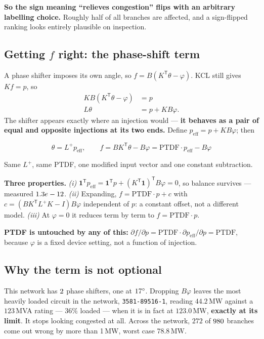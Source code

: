 \documentclass[11pt,a4paper]{article}
\newcommand{\T}{^{\mathsf{T}}}
\newcommand{\Lp}{L^{+}}
\begin{document}
\textbf{So the sign meaning ``relieves congestion'' flips with an arbitrary
labelling choice.} Roughly half of all branches are affected, and a
sign-flipped ranking looks entirely plausible on inspection.

\subsection*{Getting $f$ right: the phase-shift term}

A phase shifter imposes its own angle, so $f = B(K\T\theta - \varphi)$. KCL
still gives $Kf = p$, so
\begin{align}
  K B (K\T\theta - \varphi) &= p\\
  L\theta &= p + KB\varphi .
\end{align}
The shifter appears exactly where an injection would --- \textbf{it behaves as
a pair of equal and opposite injections at its two ends.} Define
$p_{\text{eff}} = p + KB\varphi$; then

\begin{equation}
  \boxed{\;\theta = \Lp p_{\text{eff}}, \qquad
  f = B K\T\theta - B\varphi = \text{PTDF}\cdot p_{\text{eff}} - B\varphi\;}
\end{equation}

Same $\Lp$, same PTDF, one modified input vector and one constant subtraction.

\textbf{Three properties.}
\emph{(i)} $\mathbf{1}\T p_{\text{eff}} = \mathbf{1}\T p + (K\T\mathbf{1})\T
B\varphi = 0$, so balance survives --- measured $1.3e-12$.
\emph{(ii)} Expanding, $f = \text{PTDF}\cdot p + c$ with
$c = (BK\T\Lp K - I)B\varphi$ independent of $p$: a constant offset, not a
different model.
\emph{(iii)} At $\varphi = 0$ it reduces term by term to $f = \text{PTDF}\cdot p$.

\medskip
\textbf{PTDF is untouched by any of this:}
$\partial f/\partial p = \text{PTDF}\cdot \partial p_{\text{eff}}/\partial p =
\text{PTDF}$, because $\varphi$ is a fixed device setting, not a function of
injection.

\newpage
\subsection*{Why the term is not optional}

This network has $2$ phase shifters, one at $17^\circ$. Dropping
$B\varphi$ leaves the most heavily loaded circuit in the network,
\texttt{3581-89516-1}, reading $44.2$\,MW against a $123$\,MVA rating --- $36\%$
loaded --- when it is in fact at $123.0$\,MW, \textbf{exactly at its limit}.
It stops looking congested at all. Across the network, $272$ of $980$ branches
come out wrong by more than 1\,MW, worst case $78.8$\,MW.
\end{document}
